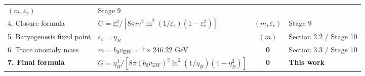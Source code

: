 \documentclass[
  11pt,
]{article}
\begin{document}
\begin{longtable}[]{@{}llcl@{}}
\begin{minipage}[t]{0.10\columnwidth}
\((m, \varepsilon_c)\)\strut
\end{minipage} & \begin{minipage}[t]{0.27\columnwidth}\raggedright
Stage 9\strut
\end{minipage}\tabularnewline
\begin{minipage}[t]{0.24\columnwidth}\raggedright
4. Closure formula\strut
\end{minipage} & \begin{minipage}[t]{0.27\columnwidth}\raggedright
\(G = \varepsilon_c^3/[8\pi m^2\ln^2(1/\varepsilon_c)(1-\varepsilon_c^2)]\)\strut
\end{minipage} & \begin{minipage}[t]{0.10\columnwidth}\centering
\((m, \varepsilon_c)\)\strut
\end{minipage} & \begin{minipage}[t]{0.27\columnwidth}\raggedright
Stage 9\strut
\end{minipage}\tabularnewline
\begin{minipage}[t]{0.24\columnwidth}\raggedright
5. Baryogenesis fixed point\strut
\end{minipage} & \begin{minipage}[t]{0.27\columnwidth}\raggedright
\(\varepsilon_c = \eta_B\)\strut
\end{minipage} & \begin{minipage}[t]{0.10\columnwidth}\centering
\((m)\)\strut
\end{minipage} & \begin{minipage}[t]{0.27\columnwidth}\raggedright
Section 2.2 / Stage 10\strut
\end{minipage}\tabularnewline
\begin{minipage}[t]{0.24\columnwidth}\raggedright
6. Trace anomaly mass\strut
\end{minipage} & \begin{minipage}[t]{0.27\columnwidth}\raggedright
\(m = b_0 v_{\text{EW}} = 7 \times 246.22\) GeV\strut
\end{minipage} & \begin{minipage}[t]{0.10\columnwidth}\centering
\textbf{0}\strut
\end{minipage} & \begin{minipage}[t]{0.27\columnwidth}\raggedright
Section 3.3 / Stage 10\strut
\end{minipage}\tabularnewline
\begin{minipage}[t]{0.24\columnwidth}\raggedright
\textbf{7. Final formula}\strut
\end{minipage} & \begin{minipage}[t]{0.27\columnwidth}\raggedright
\(G = \eta_B^3/[8\pi(b_0 v_{\text{EW}})^2\ln^2(1/\eta_B)(1-\eta_B^2)]\)\strut
\end{minipage} & \begin{minipage}[t]{0.10\columnwidth}\centering
\textbf{0}\strut
\end{minipage} & \begin{minipage}[t]{0.27\columnwidth}\raggedright
\textbf{This work}\strut
\end{minipage}\tabularnewline
\bottomrule
\end{longtable}
\end{document}
